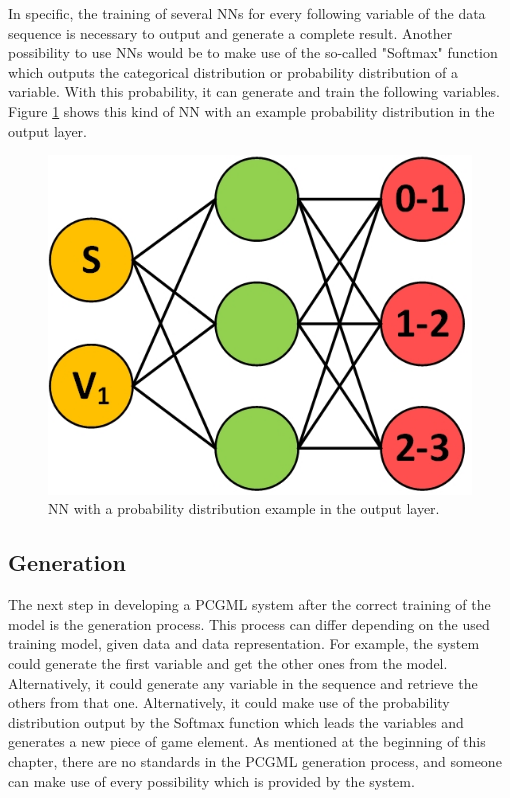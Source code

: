 \documentclass[MGS,Master,english]{twbook}%
\begin{document}
In specific, the training of several \acp{NN} for every following variable of the data sequence is necessary to output and generate a complete result. Another possibility to use \acp{NN} would be to make use of the so-called "Softmax" function which outputs the categorical distribution or probability distribution of a variable. With this probability, it can generate and train the following variables. Figure \ref{fig::PCGML::devExample::NNwithSoftmax} shows this kind of \ac{NN} with an example probability distribution in the output layer.
\begin{figure}[!htbp]
	\centering
	\includegraphics[width=0.3\linewidth]{PICs/NNs/PCGML_development_example_NN_categorical_distributions}
	\caption{\ac{NN} with a probability distribution example in the output layer.}\label{fig::PCGML::devExample::NNwithSoftmax}
\end{figure}


\subsection{Generation}
The next step in developing a \ac{PCGML} system after the correct training of the model is the generation process. This process can differ depending on the used training model, given data and data representation. For example, the system could generate the first variable and get the other ones from the model. Alternatively, it could generate any variable in the sequence and retrieve the others from that one. Alternatively, it could make use of the probability distribution output by the Softmax function which leads the variables and generates a new piece of game element. As mentioned at the beginning of this chapter, there are no standards in the \ac{PCGML} generation process, and someone can make use of every possibility which is provided by the system.
 
%
%
\clearpage
\end{document}
